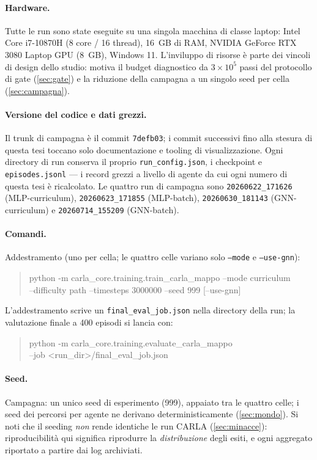 \paragraph{Hardware.}
Tutte le run sono state eseguite su una singola macchina di classe
laptop: Intel Core i7-10870H (8 core / 16 thread), \SI{16}{GB} di RAM,
NVIDIA GeForce RTX 3080 Laptop GPU (\SI{8}{GB}), Windows 11.
L'inviluppo di risorse è parte dei vincoli di design dello studio:
motiva il budget diagnostico da $3\times10^{5}$ passi del protocollo di
gate (\cref{sec:gate}) e la riduzione della campagna a un singolo seed
per cella (\cref{sec:campagna}).

\paragraph{Versione del codice e dati grezzi.}
Il trunk di campagna è il commit \texttt{7defb03}; i commit successivi
fino alla stesura di questa tesi toccano solo documentazione e tooling
di visualizzazione. Ogni directory di run conserva il proprio
\texttt{run\_config.json}, i checkpoint e \texttt{episodes.jsonl} --- i
record grezzi a livello di agente da cui ogni numero di questa tesi è
ricalcolato. Le quattro run di campagna sono
\texttt{20260622\_171626} (MLP-curriculum),
\texttt{20260623\_171855} (MLP-batch),
\texttt{20260630\_181143} (GNN-curriculum) e
\texttt{20260714\_155209} (GNN-batch).

\paragraph{Comandi.}
Addestramento (uno per cella; le quattro celle variano solo
\texttt{--mode} e \texttt{--use-gnn}):
\begin{quote}\small\ttfamily
python -m carla\_core.training.train\_carla\_mappo --mode curriculum\\
\hspace*{2em}--difficulty path --timesteps 3000000 --seed 999 [--use-gnn]
\end{quote}
L'addestramento scrive un \texttt{final\_eval\_job.json} nella directory
della run; la valutazione finale a 400 episodi si lancia con:
\begin{quote}\small\ttfamily
python -m carla\_core.training.evaluate\_carla\_mappo\\
\hspace*{2em}--job <run\_dir>/final\_eval\_job.json
\end{quote}

\paragraph{Seed.}
Campagna: un unico seed di esperimento (999), appaiato tra le quattro
celle; i seed dei percorsi per agente ne derivano deterministicamente
(\cref{sec:mondo}). Si noti che il seeding \emph{non} rende identiche le
run CARLA (\cref{sec:minacce}): riproducibilità qui significa riprodurre
la \emph{distribuzione} degli esiti, e ogni aggregato riportato a
partire dai log archiviati.
